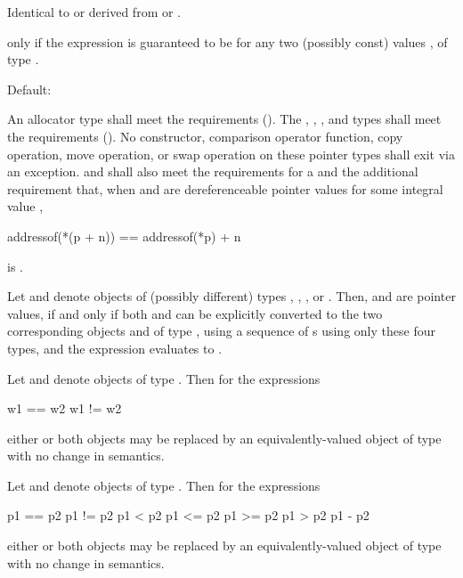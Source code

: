 \begin{itemdescr}
\pnum
\result
Identical to or derived from  or .

\pnum
\returns
{} only if the expression  is guaranteed
to be  for any two (possibly const) values
,  of type .

\pnum
\remarks
Default: 
\end{itemdescr}

\pnum
An allocator type  shall meet the
 requirements ().
The , , , and
 types shall meet the
 requirements ().
No constructor,
comparison operator function, copy operation, move operation, or swap operation on
these pointer types shall exit via an exception.  and  shall also
meet the requirements for
a  and
the additional requirement that, when  and  are
dereferenceable pointer values for some integral value ,
\begin{codeblock}
addressof(*(p + n)) == addressof(*p) + n
\end{codeblock}
is .

\pnum
Let  and  denote objects of (possibly different) types
, , ,
or . Then,  and  are
 pointer values, if and only if both  and 
can be explicitly converted to the two corresponding objects  and 
of type , using a sequence of s
using only these four types, and the expression 
evaluates to .

\pnum
Let  and  denote objects of type .
Then for the expressions
\begin{codeblock}
w1 == w2
w1 != w2
\end{codeblock}
either or both objects may be replaced by an equivalently-valued object of type
 with no change in semantics.

\pnum
Let  and  denote objects of type .
Then for the expressions
\begin{codeblock}
p1 == p2
p1 != p2
p1 < p2
p1 <= p2
p1 >= p2
p1 > p2
p1 - p2
\end{codeblock}
either or both objects may be replaced by an equivalently-valued object of type
 with no change in semantics.

